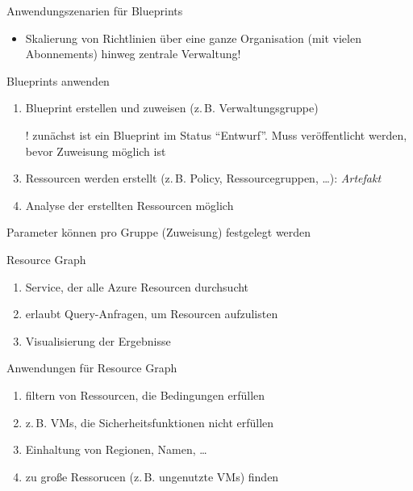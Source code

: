 \begin{flashcard}[Definition]{Anwendungszenarien für Blueprints}
  \begin{itemize}
    \item Skalierung von Richtlinien über eine ganze Organisation (mit vielen Abonnements) hinweg\newline
      zentrale Verwaltung!
  \end{itemize}
\end{flashcard}

\begin{flashcard}[Definition]{Blueprints anwenden}
  \begin{enumerate}
    \item Blueprint erstellen und zuweisen (z.\,B. Verwaltungsgruppe)
    \item[!] zunächst ist ein Blueprint im Status ``Entwurf''. Muss veröffentlicht werden, bevor Zuweisung möglich ist
    \item Ressourcen werden erstellt (z.\,B. Policy, Ressourcegruppen, \ldots): \emph{Artefakt}
    \item Analyse der erstellten Ressourcen möglich
  \end{enumerate}
  Parameter können pro Gruppe (Zuweisung) festgelegt werden
\end{flashcard}


\begin{flashcard}[Definition]{Resource Graph}
  \begin{enumerate}
    \item Service, der alle Azure Resourcen durchsucht
    \item erlaubt Query-Anfragen, um Resourcen aufzulisten
    \item Visualisierung der Ergebnisse
  \end{enumerate}
\end{flashcard}

\begin{flashcard}[Definition]{Anwendungen für Resource Graph}
  \begin{enumerate}
    \item filtern von Ressourcen, die Bedingungen erfüllen
    \item z.\,B. VMs, die Sicherheitsfunktionen nicht erfüllen
    \item Einhaltung von Regionen, Namen, \ldots
    \item zu große Ressorucen (z.\,B. ungenutzte VMs) finden
  \end{enumerate}
\end{flashcard}

